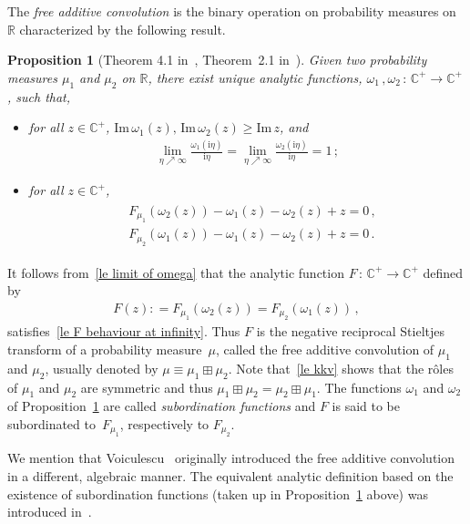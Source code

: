 \documentclass[10pt,reqno]{amsart}
\numberwithin{equation}{section}
\theoremstyle{plain}
\newtheorem{proposition}[theorem]{Proposition}
\numberwithin{kevin}{section}
\theoremstyle{remark}
\newcommand{\im}{\mathrm{Im}\,}
\newcommand{\R}{{\mathbb R }}
\newcommand{\C}{{\mathbb C}}
\newcommand{\ii}{\mathrm{i}}
\newcommand{\deq}{\mathrel{\mathop:}=}
\begin{document}
The {\it free additive convolution} is the binary operation on probability measures on $\R$ characterized by the following result.
\begin{proposition}[Theorem 4.1 in~\cite{BB}, Theorem~2.1 in~\cite{CG}]\label{le prop 1}
Given two probability measures $\mu_1$ and $\mu_2$ on $\R$, there exist unique analytic functions, $\omega_1\,,\omega_2\,:\,\C^+\rightarrow \C^+$, such that,
 \begin{itemize}[noitemsep,topsep=0pt,partopsep=0pt,parsep=0pt]
  \item[$(i)$] for all $z\in \C^+$, $\im \omega_1(z),\,\im \omega_2(z)\ge \im z$, and
  \begin{align}\label{le limit of omega}
  \lim_{\eta\nearrow\infty}\frac{\omega_1(\ii\eta)}{\ii\eta}=\lim_{\eta\nearrow\infty}\frac{\omega_2(\ii\eta)}{\ii\eta}=1\,;
  \end{align}
  \item[$(ii)$] for all $z\in\C^+$, 
\begin{align}
 \begin{aligned}\label{le definiting equations}
   &F_{\mu_1}(\omega_{2}(z))-\omega_1(z)-\omega_2(z)+z=0\,, \\
   &F_{\mu_2}(\omega_1(z))-\omega_1(z)-\omega_2(z)+z=0\,.
  \end{aligned}
\end{align}
 \end{itemize}
\end{proposition}
It follows from~\eqref{le limit of omega} that the analytic function $F\,:\,\C^+\rightarrow \C^+$ defined by
\begin{align}\label{le kkv}
 F(z)\deq F_{\mu_1}(\omega_{2}(z))=F_{\mu_2}(\omega_{1}(z))\,,
\end{align}
satisfies~\eqref{le F behaviour at infinity}. Thus $F$ is the negative reciprocal Stieltjes transform of a probability measure~$\mu$, called the free additive convolution of $\mu_1$ and $\mu_2$,  usually denoted by $\mu\equiv\mu_1\boxplus\mu_2$. Note that~\eqref{le kkv} shows that the r\^oles of $\mu_1$ and $\mu_2$ are symmetric and thus $\mu_1\boxplus\mu_2=\mu_2\boxplus\mu_1$. The functions $\omega_1$ and $\omega_2$ of Proposition~\ref{le prop 1} are called {\it subordination functions} and $F$ is said to be subordinated to~$F_{\mu_1}$, respectively to $F_{\mu_2}$. 

We mention that Voiculescu~\cite{Voi86} originally introduced the free additive convolution in a different, algebraic manner.
The equivalent analytic definition 
based on the existence of subordination functions (taken up in Proposition~\ref{le prop 1} above) was introduced in~\cite{BB, CG}.
\end{document}
